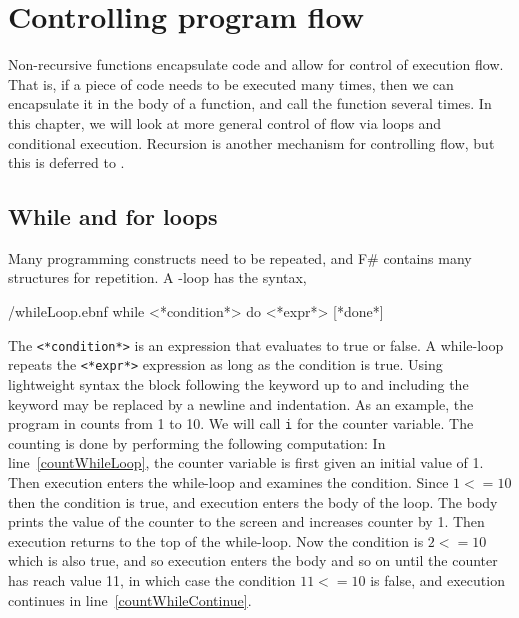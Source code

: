 \chapter{Controlling program flow}
\label{chap:flow}
Non-recursive functions encapsulate code and allow for control of execution flow. That is, if a piece of code needs to be executed many times, then we can encapsulate it in the body of a function, and call the function several times. In this chapter, we will look at more general control of flow via loops and conditional execution. Recursion is another mechanism for controlling flow, but this is deferred to .

\section{While and for loops}
Many programming constructs need to be repeated, and F\# contains many structures for repetition. A -loop has the syntax,
%
\begin{verbatimwrite}{\ebnf/whileLoop.ebnf}
while <*condition*> do <*expr*> [*done*]
\end{verbatimwrite}
%
The  \lstinline[language=syntax]{<*condition*>} is an expression that evaluates to true or false. A while-loop repeats the \lstinline[language=syntax]{<*expr*>} expression as long as the condition is true.  Using lightweight syntax the block following the  keyword up to and including the  keyword may be replaced by a newline and indentation. As an example, the program in  counts from 1 to 10.
%
%
We will call \lstinline{i} for the counter variable. The counting is done by performing the following computation: In line~\ref{countWhileLoop}, the counter variable is first given an initial value of 1. Then execution enters the while-loop and examines the condition. Since $1 <= 10$ then the condition is true, and execution enters the body of the loop. The body prints the value of the counter to the screen and increases counter by 1. Then execution returns to the top of the while-loop. Now the condition is $2 <= 10$ which is also true, and so execution enters the body and so on until the counter has reach value 11, in which case the condition $11 <= 10$ is false, and execution continues in line~\ref{countWhileContinue}.

